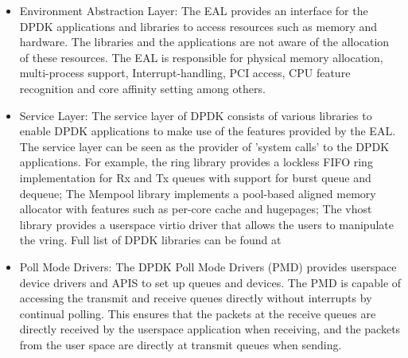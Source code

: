 \begin{itemize}
 \item Environment Abstraction Layer: The EAL provides an interface for the DPDK applications and libraries to access resources such as memory and hardware. The libraries and the applications are not aware of the allocation of these resources. The EAL is responsible for physical memory allocation, multi-process support, Interrupt-handling, PCI access, CPU feature recognition and core affinity setting among others.
 \item Service Layer: The service layer of DPDK consists of various libraries to enable DPDK applications to make use of the features provided by the EAL. The service layer can be seen as the provider of 'system calls' to the DPDK applications. For example, the ring library provides a lockless FIFO ring implementation for Rx and Tx queues with support for burst queue and dequeue; The Mempool library implements a pool-based aligned memory allocator with features such as per-core cache and hugepages; The vhost library provides a userspace virtio driver that allows the users to manipulate the vring. Full list of DPDK libraries can be found at \cite{DPDK}
 \item Poll Mode Drivers: The DPDK Poll Mode Drivers (PMD) provides userspace device drivers and APIS to set up queues and devices. The PMD is capable of accessing the transmit and receive queues directly without interrupts by continual polling. This ensures that the packets at the receive queues are directly received by the userspace application when receiving, and the packets from the user space are directly at transmit queues when sending.
\end{itemize}


